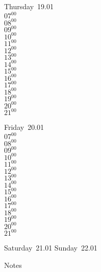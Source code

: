 \documentclass[11pt,a4paper]{book}\usepackage[]{graphicx}\usepackage[]{color}
\begin{document}
\clearpage
\begin{headerbox}
\end{headerbox}
\begin{weekdaybox}
  Thursday~19.01\\
  { 
  \vfill
  $07^{00}$\\
$08^{00}$\\
$09^{00}$\\
$10^{00}$\\
$11^{00}$\\
$12^{00}$\\
$13^{00}$\\
$14^{00}$\\
$15^{00}$\\
$16^{00}$\\
$17^{00}$\\
$18^{00}$\\
$19^{00}$\\
$20^{00}$\\
$21^{00}$\\
  }
\end{weekdaybox} 
\begin{weekdaybox}
  Friday~20.01\\
  { 
  \vfill
  $07^{00}$\\
$08^{00}$\\
$09^{00}$\\
$10^{00}$\\
$11^{00}$\\
$12^{00}$\\
$13^{00}$\\
$14^{00}$\\
$15^{00}$\\
$16^{00}$\\
$17^{00}$\\
$18^{00}$\\
$19^{00}$\\
$20^{00}$\\
$21^{00}$\\
  }
\end{weekdaybox}
\begin{weekendbox}
  Saturday~21.01
  \tcblower
  Sunday~22.01
\end{weekendbox} %
\begin{notebox}
  Notes
\end{notebox}
\clearpage
\end{document}
